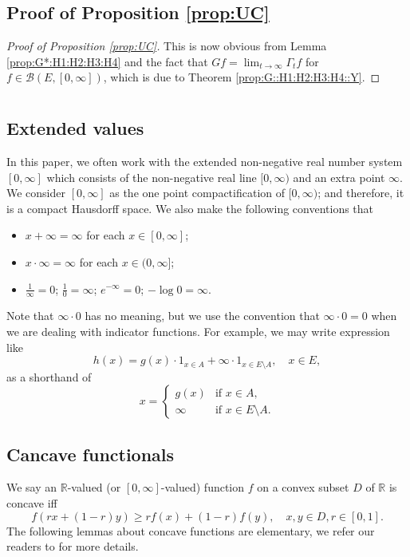 \documentclass[12pt,a4paper]{amsart}
\numberwithin{equation}{section}
\theoremstyle{plain}
\theoremstyle{definition}
\theoremstyle{remark}
\begin{document}
\subsection{Proof of Proposition \ref{prop:UC}} \label{sec:UC}
\begin{proof}[Proof of Proposition \ref{prop:UC}]
	This is now obvious from Lemma \ref{prop:G*:H1:H2:H3:H4} and the fact that $Gf = \lim_{t\to \infty} \Gamma_t f$ for $f\in \mathcal B(E,[0,\infty])$, which is due to Theorem \ref{prop:G::H1:H2:H3:H4::Y}.
\end{proof}

\appendix\section{}
\subsection{Extended values} \label{sec:EV}
	In this paper, we often work with the extended non-negative real number system $[0,\infty]$ which consists of the non-negative real line $[0,\infty)$ and an extra point $\infty$.
	We consider $[0,\infty]$ as the one point compactification of $[0,\infty)$; and therefore, it is a compact Hausdorff space.
	We also make the following conventions that
\begin{itemize}
\item
	$x + \infty = \infty$ for each $x\in [0,\infty]$;
\item
	$x \cdot \infty = \infty$ for each $x\in (0,\infty]$;
\item
	$\frac{1}{\infty} = 0$; $\frac{1}{0} = \infty$; $e^{-\infty} =0$; $-\log 0 = \infty$.
\end{itemize}
	Note that $ \infty \cdot 0$ has no meaning, but we use the convention that $\infty \cdot 0 = 0$ when we are dealing with indicator functions. 
	For example, we may write expression like
\begin{equation}
	h(x)
	= g(x) \cdot  1_{x\in A} + \infty \cdot  1_{x \in E\setminus A}, \quad x\in E,
\end{equation}
	as a shorthand of
\begin{equation}
	x =
\begin{cases}
	g(x) & \text{if $x\in A$},
	\\ \infty & \text{if $x\in E\setminus A$}.
\end{cases}
\end{equation}

\subsection{Cancave functionals}
	We say an $\mathbb R$-valued (or $[0,\infty]$-valued) function $f$ on a convex subset $D$ of $\mathbb R$ is concave iff
\[
   	f(rx+(1-r) y)
 	\geq r f(x) + (1-r) f(y),
 	\quad x,y \in D, r \in [0,1].
\]
	The following lemmas about concave functions are elementary, we refer our readers to \cite[Chapter 6]{Dudley2002Real} for more details.
\end{document}
